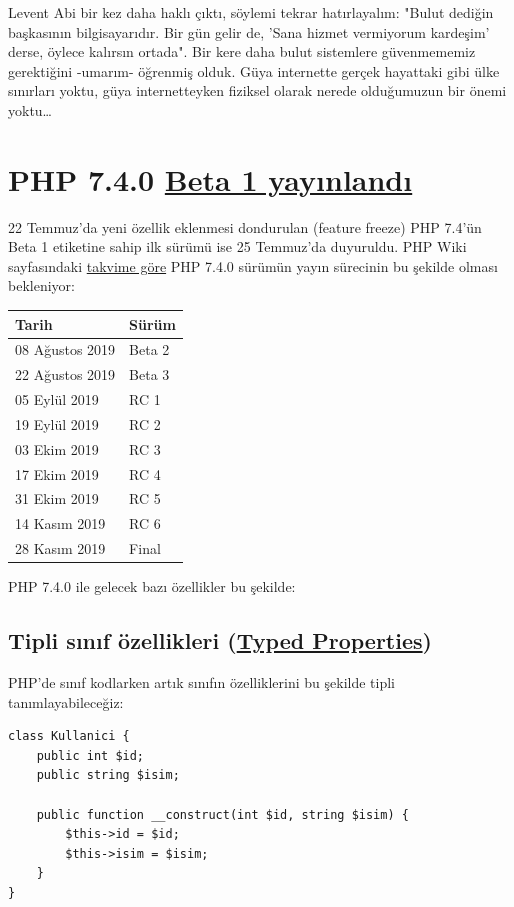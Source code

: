 \documentclass[11pt]{article}
\begin{document}
Levent Abi bir kez daha haklı çıktı, söylemi tekrar hatırlayalım: "Bulut
dediğin başkasının bilgisayarıdır. Bir gün gelir de, 'Sana hizmet vermiyorum
kardeşim' derse, öylece kalırsın ortada". Bir kere daha bulut sistemlere
güvenmememiz gerektiğini -umarım- öğrenmiş olduk. Güya internette gerçek
hayattaki gibi ülke sınırları yoktu, güya internetteyken fiziksel olarak
nerede olduğumuzun bir önemi yoktu\ldots{}
\section{PHP 7.4.0 \href{https://www.php.net/archive/2019.php\#2019-07-25-1}{Beta 1 yayınlandı}}
\label{sec:org6fca5c6}
22 Temmuz'da yeni özellik eklenmesi dondurulan (feature freeze) PHP 7.4'ün Beta
1 etiketine sahip ilk sürümü ise 25 Temmuz'da duyuruldu. PHP Wiki sayfasındaki
\href{https://wiki.php.net/todo/php74}{takvime göre} PHP 7.4.0 sürümün yayın sürecinin bu şekilde olması bekleniyor:

\begin{center}
\begin{tabular}{ll}
Tarih & Sürüm\\
\hline
08 Ağustos 2019 & Beta 2\\
22 Ağustos 2019 & Beta 3\\
05 Eylül 2019 & RC 1\\
19 Eylül 2019 & RC 2\\
03 Ekim 2019 & RC 3\\
17 Ekim 2019 & RC 4\\
31 Ekim 2019 & RC 5\\
14 Kasım 2019 & RC 6\\
28 Kasım 2019 & Final\\
\end{tabular}
\end{center}

PHP 7.4.0 ile gelecek bazı özellikler bu şekilde:
\subsection{Tipli sınıf özellikleri (\href{https://wiki.php.net/rfc/typed\_properties\_v2}{Typed Properties})}
\label{sec:org0d07af7}
PHP'de sınıf kodlarken artık sınıfın özelliklerini bu şekilde tipli
tanımlayabileceğiz:

\begin{verbatim}
class Kullanici {
    public int $id;
    public string $isim;

    public function __construct(int $id, string $isim) {
        $this->id = $id;
        $this->isim = $isim;
    }
}
\end{verbatim}
\end{document}
